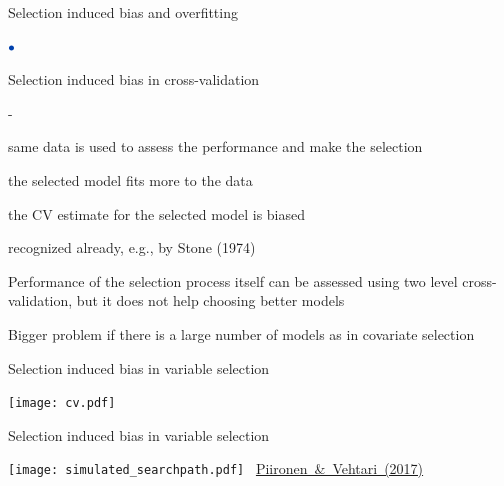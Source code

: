 \documentclass[english,t]{beamer}
\newenvironment{list1}{
   \begin{list}{$\color{list1}\bullet$}{\itemsep=6pt}}{
  \end{list}}
\newenvironment{list2}{
  \begin{list}{-}{\baselineskip=12pt\itemsep=2pt}}{
  \end{list}}
\begin{document}
\begin{frame}{Selection induced bias and overfitting}

  \begin{list1}
  \item Selection induced bias in cross-validation
    \begin{list2}
    \item same data is used to assess the performance and make the selection
    \item the selected model fits more to the data
    \item the CV estimate for the selected model is biased
    \item recognized already, e.g., by Stone (1974)
    \end{list2}
    \pause
  \item Performance of the selection process itself can be assessed
    using two level cross-validation, but it does not help choosing
    better models
    \pause
  \item Bigger problem if there is a large number of models as in
    covariate selection
  \end{list1}

\end{frame}

\begin{frame}{Selection induced bias in variable selection}

  \texttt{[image: cv.pdf]}

\end{frame}

\begin{frame}{Selection induced bias in variable selection}

  \texttt{[image: simulated\_searchpath.pdf]}
   \vspace{-1.5\baselineskip}
   \mbox{{\hspace{8cm} \footnotesize \href{http://link.springer.com/article/10.1007/s11222-016-9649-y}{Piironen \& Vehtari (2017)}}}

\end{frame}



\end{document}
